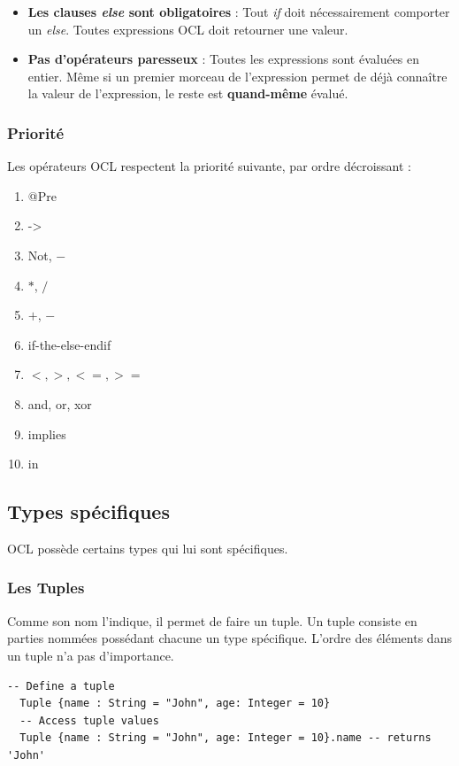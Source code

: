 \documentclass[../Syllabus.tex]{subfiles}
\begin{document}
\begin{warningblock}
	\begin{itemize}
		\item \textbf{Les clauses \textit{else} sont obligatoires} : Tout \textit{if} doit nécessairement comporter un \textit{else}. Toutes expressions OCL doit retourner une valeur.
		\item \textbf{Pas d'opérateurs paresseux} : Toutes les expressions sont évaluées en entier. Même si un premier morceau de l'expression permet de déjà connaître la valeur de l'expression, le reste est \textbf{quand-même} évalué.
	\end{itemize}
\end{warningblock}

\subsubsection{Priorité}

Les opérateurs OCL respectent la priorité suivante, par ordre décroissant :

\begin{enumerate}
	\item @Pre
	\item ->
	\item Not, $-$
	\item $*$, $/$
	\item $+$, $-$
	\item if-the-else-endif
	\item $<,>,<=,>=$
	\item and, or, xor
	\item implies
	\item in
\end{enumerate}

\subsection{Types spécifiques}

OCL possède certains types qui lui sont spécifiques.

\subsubsection{Les Tuples}

Comme son nom l'indique, il permet de faire un tuple. Un tuple consiste en parties nommées possédant chacune un type spécifique. L'ordre des éléments dans un tuple n'a pas d'importance.

\begin{lstlisting}[language=OCL]
  -- Define a tuple
  Tuple {name : String = "John", age: Integer = 10}
  -- Access tuple values
  Tuple {name : String = "John", age: Integer = 10}.name -- returns 'John'
\end{lstlisting}
\end{document}

